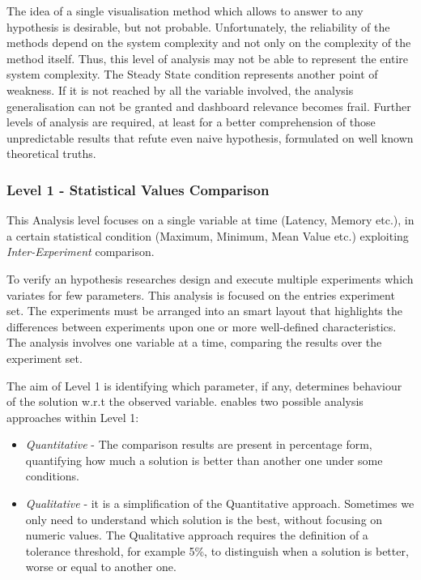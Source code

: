 The idea of a single visualisation method which allows to answer to any hypothesis is desirable, but not probable.  Unfortunately, the reliability of the methods depend on the system complexity and not only on the complexity of the method itself. Thus, this level of analysis may not be able to represent the entire system complexity. The Steady State condition represents another point of weakness. If it is not reached by all the variable involved, the analysis generalisation can not be granted and dashboard relevance becomes frail. Further levels of analysis are required, at least for a better comprehension of those unpredictable results that refute even naive hypothesis, formulated on well known theoretical truths.


\subsubsection{Level 1 -  Statistical Values Comparison}\label{sec:heaven-level1}

This Analysis level focuses on a single variable at time (Latency, Memory etc.), in a certain statistical condition (Maximum, Minimum, Mean Value etc.) exploiting \textit{Inter-Experiment} comparison. 

To verify an hypothesis researches design and execute multiple experiments which variates for few parameters. This analysis is focused on the entries experiment set. The experiments must be arranged into an smart layout that highlights the differences between experiments upon one or more well-defined characteristics. The analysis involves one variable at a time, comparing the results over the experiment set. 

The aim of Level 1 is identifying which parameter, if any, determines behaviour of the solution w.r.t the observed variable. \name enables two possible analysis approaches within Level 1:
\begin{itemize}
\item \textit{Quantitative} -  The comparison results are present in percentage form, quantifying how much a solution is better than another one under some conditions. 
\item \textit{Qualitative} - it is a simplification of the Quantitative approach. Sometimes we only need to understand which solution is the best, without focusing on numeric values. The Qualitative approach requires the definition of a tolerance threshold, for example 5\%, to distinguish when a solution is better, worse or equal to another one.
\end{itemize}

